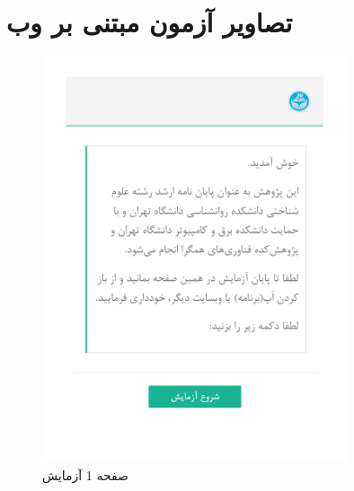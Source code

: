 
\chapter{تصاویر آزمون مبتنی بر وب}
\label{app:latex:more}
\thispagestyle{empty}

\begin{figure}[htpb]
    \centering
    \includegraphics[width=0.8\textwidth]{./img/Task1.png}
    \caption{ صفحه 1 آزمایش }
    \label{fig:Task1}
\end{figure}


